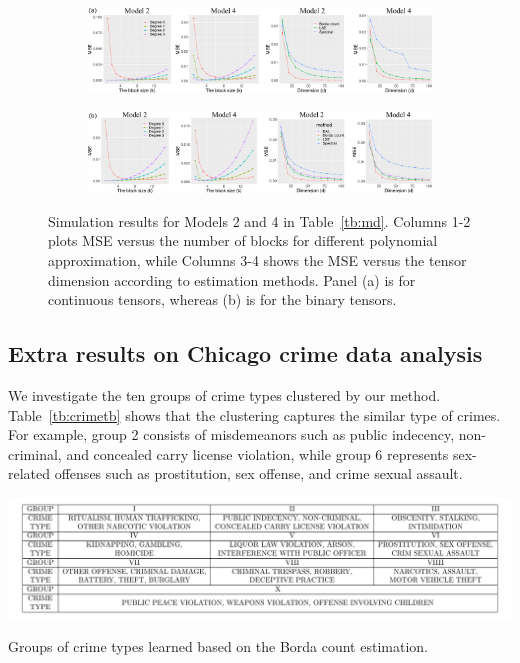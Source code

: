 \documentclass[11pt]{article}
\theoremstyle{definition}
\begin{document}
\begin{figure}[htp!]
    \centering
    \begin{subfigure}[b]{\textwidth}
    \includegraphics[width = \textwidth]{figure/extra_conti.pdf}  
        \vspace{0cm}
    \end{subfigure}
    \begin{subfigure}[b]{\textwidth}
    \includegraphics[width = \textwidth]{figure/extra_binary.pdf}    
    \end{subfigure}
    \caption{Simulation results for Models 2 and 4 in Table~\ref{tb:md}. Columns 1-2 plots MSE versus the number of blocks for different polynomial approximation, while Columns 3-4 shows the MSE versus the tensor dimension according to estimation methods. Panel (a) is for continuous tensors, whereas (b) is for the binary tensors.}
    \label{fig:extrasim1}
\end{figure}


\subsection{Extra results on Chicago crime data analysis}\label{subsec:chicago}
We investigate the ten groups of crime types clustered by our method. Table~\ref{tb:crimetb} shows that the clustering captures the similar type of crimes. For example, group 2 consists of misdemeanors such as public indecency, non-criminal, and concealed carry license violation, while group 6 represents sex-related offenses such as prostitution, sex offense, and crime sexual assault.

\begin{table}[ht!]
    \centering
    \includegraphics[width = \textwidth]{figure/crimetable.pdf}
    \caption{Groups of crime types learned based on the Borda count estimation.}
    \label{tb:crimetb}
\end{table}
\end{document}

